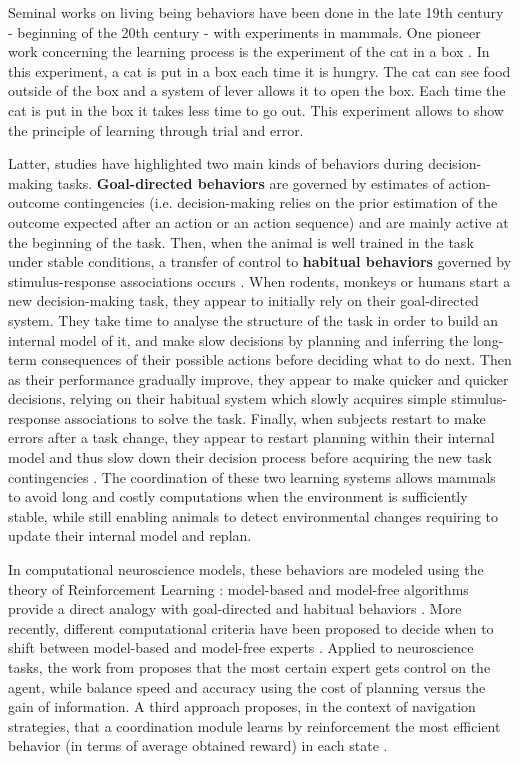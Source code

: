 \documentclass[english,a4paper,11pt,twoside]{StyleThese}
\begin{document}
Seminal works on living being behaviors have been done in the late 19th century - beginning of the 20th century - with experiments in mammals. One pioneer work concerning the learning process is the experiment of the cat in a box \cite{thorndike1998animal}. In this experiment, a cat is put in a box each time it is hungry. The cat can see food outside of the box and a system of lever allows it to open the box. Each time the cat is put in the box it takes less time to go out. This experiment allows to show the principle of learning through trial and error. 

Latter, studies have highlighted two main kinds of behaviors during decision-making tasks. \textbf{Goal-directed behaviors} are governed by estimates of action-outcome contingencies (i.e. decision-making relies on the prior estimation of the outcome expected after an action or an action sequence) and are mainly active at the beginning of the task. Then, when the animal is well trained in the task under stable conditions, a transfer of control to \textbf{habitual behaviors} governed by stimulus-response associations occurs  \cite{dickinson1985actions}. When rodents, monkeys or humans start a new decision-making task, they appear to initially rely on their goal-directed system. They take time to analyse the structure of the task in order to build an internal model of it, and make slow decisions by planning and inferring the long-term consequences of their possible actions before deciding what to do next. Then as their performance gradually improve, they appear to make quicker and quicker decisions, relying on their habitual system which slowly acquires simple stimulus-response associations to solve the task. Finally, when subjects restart to make errors after a task change, they appear to restart planning within their internal model and thus slow down their decision process before acquiring the new task contingencies \cite{balleine2010human, dolan2013goals}. The coordination of these two learning systems allows mammals to avoid long and costly computations when the environment is sufficiently stable, while still enabling animals to detect environmental changes requiring to update their internal model and replan.

In computational neuroscience models, these behaviors are modeled using the theory of Reinforcement Learning \cite{sutton1998introduction}: model-based and model-free algorithms provide a direct analogy with goal-directed and habitual behaviors \cite{daw2005uncertainty}. More recently, different computational criteria have been proposed to decide when to shift between model-based and model-free experts \cite{pezzulo2013mixed, lesaint2014modelling, viejo2015modeling}. Applied to neuroscience tasks, the work from \cite{daw2005uncertainty} proposes that the most certain expert gets control on the agent, while \cite{keramati2011speed} balance speed and accuracy using the cost of planning versus the gain of information. A third approach proposes, in the context of navigation strategies, that a coordination module learns by reinforcement the most efficient behavior (in terms of average obtained reward) in each state \cite{dolle2010path}.
\end{document}
